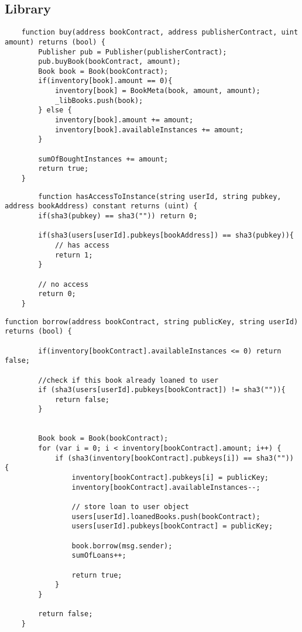 \subsection{Library}
\begin{lstlisting}
	function buy(address bookContract, address publisherContract, uint amount) returns (bool) {
		Publisher pub = Publisher(publisherContract);
		pub.buyBook(bookContract, amount);
        Book book = Book(bookContract);
        if(inventory[book].amount == 0){
            inventory[book] = BookMeta(book, amount, amount);
		    _libBooks.push(book);
		} else {
            inventory[book].amount += amount;
            inventory[book].availableInstances += amount;
		}

		sumOfBoughtInstances += amount;
		return true;
	}
\end{lstlisting}

\begin{lstlisting}
	    function hasAccessToInstance(string userId, string pubkey, address bookAddress) constant returns (uint) {
        if(sha3(pubkey) == sha3("")) return 0;

        if(sha3(users[userId].pubkeys[bookAddress]) == sha3(pubkey)){
            // has access
            return 1;
        }

        // no access
        return 0;
    }
\end{lstlisting}



\begin{lstlisting}
function borrow(address bookContract, string publicKey, string userId) returns (bool) {

		if(inventory[bookContract].availableInstances <= 0) return false;

		//check if this book already loaned to user
        if (sha3(users[userId].pubkeys[bookContract]) != sha3("")){
            return false;
        }


		Book book = Book(bookContract);
        for (var i = 0; i < inventory[bookContract].amount; i++) {
            if (sha3(inventory[bookContract].pubkeys[i]) == sha3("")) {
                inventory[bookContract].pubkeys[i] = publicKey;
                inventory[bookContract].availableInstances--;

                // store loan to user object
                users[userId].loanedBooks.push(bookContract);
                users[userId].pubkeys[bookContract] = publicKey;

                book.borrow(msg.sender);
                sumOfLoans++;

                return true;
            }
        }

        return false;
	}
\end{lstlisting}


